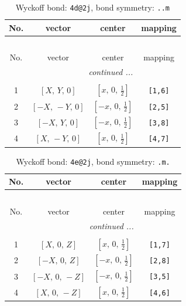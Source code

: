 \documentclass[fleqn,8pt]{jsarticle}
\begin{document}
\begin{longtable}{cccc}
\caption{Wyckoff bond: {\tt 4d@2j}, bond symmetry: {\tt ..m}}
 \\
 \hline \hline
No. & vector & center & mapping \\ \hline \endfirsthead

\multicolumn{3}{l}{\tablename\ \thetable{}} \\
 \hline \hline
No. & vector & center & mapping \\ \hline \endhead

 \hline \hline
\multicolumn{3}{r}{\footnotesize\it continued ...} \\ \endfoot

 \hline \hline
\multicolumn{3}{r}{} \\ \endlastfoot

1 & $\left[ X,\, Y,\, 0 \right]$ & $\left[ x,\, 0,\, \frac{1}{2} \right]$ & {\tt [1,6]} \\ \hline
2 & $\left[ - X,\, - Y,\, 0 \right]$ & $\left[ - x,\, 0,\, \frac{1}{2} \right]$ & {\tt [2,5]} \\ \hline
3 & $\left[ - X,\, Y,\, 0 \right]$ & $\left[ - x,\, 0,\, \frac{1}{2} \right]$ & {\tt [3,8]} \\ \hline
4 & $\left[ X,\, - Y,\, 0 \right]$ & $\left[ x,\, 0,\, \frac{1}{2} \right]$ & {\tt [4,7]} \\
\end{longtable}
\renewcommand{\arraystretch}{1.2}
\begin{longtable}{cccc}
\caption{Wyckoff bond: {\tt 4e@2j}, bond symmetry: {\tt .m.}}
 \\
 \hline \hline
No. & vector & center & mapping \\ \hline \endfirsthead

\multicolumn{3}{l}{\tablename\ \thetable{}} \\
 \hline \hline
No. & vector & center & mapping \\ \hline \endhead

 \hline \hline
\multicolumn{3}{r}{\footnotesize\it continued ...} \\ \endfoot

 \hline \hline
\multicolumn{3}{r}{} \\ \endlastfoot

1 & $\left[ X,\, 0,\, Z \right]$ & $\left[ x,\, 0,\, \frac{1}{2} \right]$ & {\tt [1,7]} \\ \hline
2 & $\left[ - X,\, 0,\, Z \right]$ & $\left[ - x,\, 0,\, \frac{1}{2} \right]$ & {\tt [2,8]} \\ \hline
3 & $\left[ - X,\, 0,\, - Z \right]$ & $\left[ - x,\, 0,\, \frac{1}{2} \right]$ & {\tt [3,5]} \\ \hline
4 & $\left[ X,\, 0,\, - Z \right]$ & $\left[ x,\, 0,\, \frac{1}{2} \right]$ & {\tt [4,6]} \\
\end{longtable}
\end{document}
